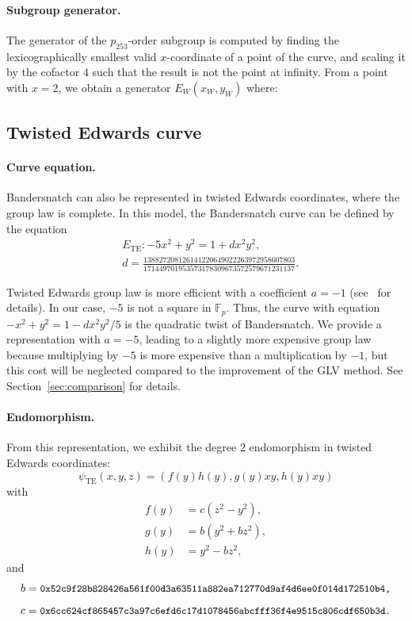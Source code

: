 \documentclass[smallextended]{svjour3}
\newcommand{\Fp}{\ensuremath{\mathbb F_p}}
\begin{document}
\paragraph{Subgroup generator.}
The generator of the $p_{253}$-order subgroup is computed by finding the
lexicographically smallest valid $x$-coordinate of a point of the
curve, and scaling it by the cofactor $4$ such that the result is not
the point at infinity. From a point with $x=2$, we obtain a generator $E_W(x_W,y_W)$ where:


\subsection{Twisted Edwards curve}
\paragraph{Curve equation.}
Bandersnatch can also be represented in twisted Edwards coordinates,
where the group law is complete.
In this model, the Bandersnatch curve can be defined by the equation
\begin{align*}
&E_\text{TE}:-5x^2+y^2 = 1 + dx^2y^2, \\
&d=\frac{138827208126141220649022263972958607803}{171449701953573178309673572579671231137}.
\end{align*}

Twisted Edwards group law is more efficient with a coefficient
$a = -1$ (see~\cite{AC:HWCD08} for details).
In our case, $-5$ is not a square in $\Fp$. Thus, the curve with
equation $-x^2+y^2 = 1 -dx^2y^2/5$ is the quadratic twist of
Bandersnatch. We provide a representation with $a=-5$, leading to a
slightly more expensive group law because multiplying by $-5$ is more
expensive than a multiplication by $-1$, but this cost will be
neglected compared to the improvement of the GLV method. See
Section~\ref{sec:comparison} for details.

\paragraph{Endomorphism.}
From this representation, we exhibit the degree $2$ endomorphism in
twisted Edwards coordinates:
$$
\psi_\text{TE}(x,y,z) = \left(f(y)h(y), g(y)xy, h(y)xy\right)$$
with
\begin{align*}
  f(y) &= c(z^2-y^2),\\
  g(y) &= b(y^2+bz^2),\\
  h(y) &= y^2-bz^2,
\end{align*}
and
$$b = \text{{\small {\tt 0x52c9f28b828426a561f00d3a63511a882ea712770d9af4d6ee0f014d172510b4,}}}$$
$$c = \text{{\small {\tt 0x6cc624cf865457c3a97c6efd6c17d1078456abcfff36f4e9515c806cdf650b3d.}}}$$
\end{document}

